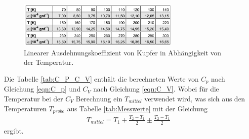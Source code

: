 \begin{figure}
  \centering
  \includegraphics[width=0.7\textwidth]{alpha.PNG}
  \caption{Linearer Ausdehnungskoeffizient von Kupfer in Abhängigkeit von der Temperatur.}
  \label{fig:alpha}
\end{figure}

Die Tabelle \ref{tab:C_P_C_V} enthält die berechneten Werte von $C_p$ nach Gleichung \eqref{eqn:C_p} und $C_V$ nach Gleichung \eqref{eqn:C_V}.
Wobei für die Temperatur bei der $C_V$ Berechnung ein $T_{mittel}$ verwendet wird, was sich aus den Temperaturen $T_{probe}$ aus Tabelle \ref{tab:Messwerte}
mit der Gleichung
\begin{align}
  T_{mittel} = T_1 + \frac{T_2-T_1}{2} \pm \frac{T_2-T_1}{2}
\end{align}
ergibt.

